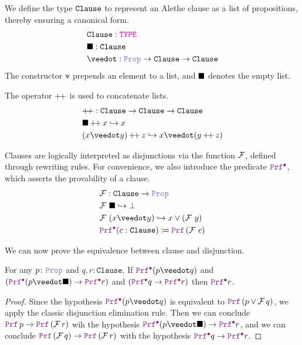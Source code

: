\begin{definition}\label{def:encoding-clause}
We define the type $\kw{Clause}$ to represent an Alethe clause as a list of propositions, thereby ensuring a canonical form.
\begin{align*}
&\texttt{Clause}: \type \\
&\nil: \texttt{Clause} \\
&\veedot: \prop \ra \texttt{Clause}  \ra \texttt{Clause}
\end{align*}
The constructor $\veedot$ prepends an element to a list, and $\nil$ denotes the empty list.
\end{definition}

\begin{definition}
The operator $\pp$ is used to concatenate lists.
\begin{align*}
& \pp: \texttt{Clause} \ra \texttt{Clause} \ra \texttt{Clause} \\
& \nil \mathop{\pp} x \re x \\
& (x \veedot y) \mathop{\pp} z \re x \veedot (y \mathop{\pp} z)
\end{align*}
\end{definition}

\begin{definition}
Clauses are logically interpreted as disjunctions via the function $\cal{F}$, defined through rewriting rules. For convenience, we also introduce the predicate $\pid$, which asserts the provability of a clause.
\begin{align*}
& \cal{F}: \texttt{Clause} \ra \prop \\
& \cal{F}~\nil \re \bot\\
& \cal{F}~(x \veedot y) \re x \lor (\cal{F}~y) \\
& \pid (c : \texttt{Clause}) \coloneqq \prf\,(\cal{F}~c)
\end{align*}
\end{definition}

We can now prove the equivalence between clause and disjunction.

\begin{lemma}\label{lemma:clause-elim}
For any $p \colon \prop$ and $q,r \colon \texttt{Clause}$, If $\pid (p \veedot q)$ and $(\pid (p \veedot \nil) \ra  \pid r)$ and $(\pid q \ra  \pid r)$ then $\pid r$.
\end{lemma}
\begin{proof}
Since the hypothesis $\pid (p \veedot q)$ is equivalent to $\prf\,(p \lor \cal{F}\,q)$, we apply the classic disjunction elimination rule.
Then we can conclude $\prf\,p \ra \prf\,(\cal{F}\,r)$ wih the hypothesis $\pid (p \veedot \nil) \ra  \pid r$, and we can conclude $\prf\,(\cal{F}\,q) \ra \prf\,(\cal{F}\,r)$
with the hypothesis $\pid q \ra  \pid r$.
\end{proof}

